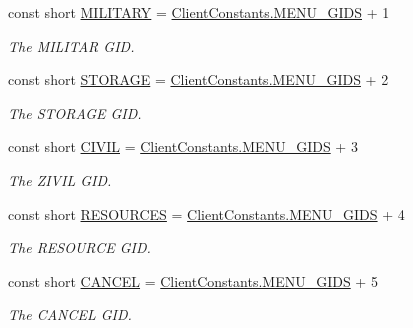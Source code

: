 \begin{DoxyCompactItemize}
\item 
const short \hyperlink{classClient_1_1Common_1_1Constants_1_1BuildingMenuGid_a158e648c0b0d02214ed418508b80855d}{M\+I\+L\+I\+T\+A\+R\+Y} = \hyperlink{classClient_1_1Common_1_1Constants_1_1ClientConstants_a4d3b0e4f36481c991c9995cb20c9347d}{Client\+Constants.\+M\+E\+N\+U\+\_\+\+G\+I\+D\+S} + 1
\begin{DoxyCompactList}\small\item\em The M\+I\+L\+I\+T\+A\+R G\+I\+D. \end{DoxyCompactList}\item 
const short \hyperlink{classClient_1_1Common_1_1Constants_1_1BuildingMenuGid_a140226a4ce1dde3dfb4d0f04097544cf}{S\+T\+O\+R\+A\+G\+E} = \hyperlink{classClient_1_1Common_1_1Constants_1_1ClientConstants_a4d3b0e4f36481c991c9995cb20c9347d}{Client\+Constants.\+M\+E\+N\+U\+\_\+\+G\+I\+D\+S} + 2
\begin{DoxyCompactList}\small\item\em The S\+T\+O\+R\+A\+G\+E G\+I\+D. \end{DoxyCompactList}\item 
const short \hyperlink{classClient_1_1Common_1_1Constants_1_1BuildingMenuGid_aa0f7e4045ddcdcde1b66a8aacdc44afe}{C\+I\+V\+I\+L} = \hyperlink{classClient_1_1Common_1_1Constants_1_1ClientConstants_a4d3b0e4f36481c991c9995cb20c9347d}{Client\+Constants.\+M\+E\+N\+U\+\_\+\+G\+I\+D\+S} + 3
\begin{DoxyCompactList}\small\item\em The Z\+I\+V\+I\+L G\+I\+D. \end{DoxyCompactList}\item 
const short \hyperlink{classClient_1_1Common_1_1Constants_1_1BuildingMenuGid_a17d71ecf9cb1096aa783f354985fc8c8}{R\+E\+S\+O\+U\+R\+C\+E\+S} = \hyperlink{classClient_1_1Common_1_1Constants_1_1ClientConstants_a4d3b0e4f36481c991c9995cb20c9347d}{Client\+Constants.\+M\+E\+N\+U\+\_\+\+G\+I\+D\+S} + 4
\begin{DoxyCompactList}\small\item\em The R\+E\+S\+O\+U\+R\+C\+E G\+I\+D. \end{DoxyCompactList}\item 
const short \hyperlink{classClient_1_1Common_1_1Constants_1_1BuildingMenuGid_a579cfcb906bd63b371b97d8dab21bcb3}{C\+A\+N\+C\+E\+L} = \hyperlink{classClient_1_1Common_1_1Constants_1_1ClientConstants_a4d3b0e4f36481c991c9995cb20c9347d}{Client\+Constants.\+M\+E\+N\+U\+\_\+\+G\+I\+D\+S} + 5
\begin{DoxyCompactList}\small\item\em The C\+A\+N\+C\+E\+L G\+I\+D. \end{DoxyCompactList}\item 

\end{DoxyCompactItemize}
